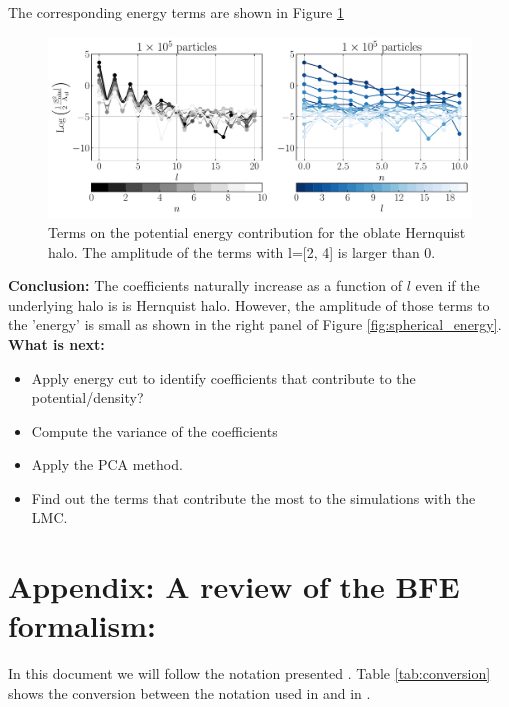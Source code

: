 \documentclass[14pt]{article}
\begin{document}
The corresponding energy terms are shown in Figure \ref{fig:energy_oblate}

\begin{figure}[H]
  \centering
  \includegraphics[scale=0.5]{../code/energy_terms_oblate_hern_a_40_1E5.pdf}
  \caption{Terms on the potential energy contribution for the oblate Hernquist halo.
The amplitude of the terms with l=[2, 4] is larger than 0.} \label{fig:energy_oblate}
\end{figure}




\textbf{Conclusion:} The coefficients naturally increase as a function of $l$
even if the underlying halo is is Hernquist halo. However, the amplitude of those terms
to the 'energy' is small as shown in the right panel of Figure \ref{fig:spherical_energy}.\\

\textbf{What is next:}\\
\begin{itemize}
\item Apply energy cut to identify coefficients that contribute to the potential/density?
\item Compute the variance of the coefficients
\item Apply the PCA method. 
\item Find out the terms that contribute the most to the simulations with the LMC.
\end{itemize}




\appendix


\section*{Appendix: A review of the BFE formalism:}\label{sec:appendix}

In this document we will follow the notation presented \cite{Lowing11}. Table
\ref{tab:conversion} shows the conversion between the notation used in \cite{Hernquist92} and
in \cite{Lowing11}.
\end{document}
